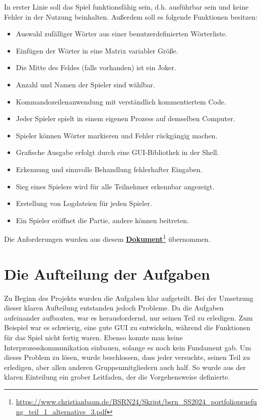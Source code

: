 \documentclass{llncs}
\begin{document}
In erster Linie soll das Spiel funktionsfähig sein, d.h. ausführbar sein und keine Fehler in der Nutzung beinhalten. Außerdem soll es folgende Funktionen besitzen: 
\begin{itemize} 
    \item Auswahl zufälliger Wörter aus einer benutzerdefinierten Wörterliste.
    \item Einfügen der Wörter in eine Matrix variabler Größe.
    \item Die Mitte des Feldes (falls vorhanden) ist ein Joker.
    \item Anzahl und Namen der Spieler sind wählbar.
    \item Kommandozeilenanwendung mit verständlich kommentiertem Code.
    \item Jeder Spieler spielt in einem eigenen Prozess auf demselben Computer.
    \item Spieler können Wörter markieren und Fehler rückgängig machen.
    \item Grafische Ausgabe erfolgt durch eine GUI-Bibliothek in der Shell.
    \item Erkennung und sinnvolle Behandlung fehlerhafter Eingaben.
    \item Sieg eines Spielers wird für alle Teilnehmer erkennbar angezeigt.
    \item Erstellung von Logdateien für jeden Spieler.
    \item Ein Spieler eröffnet die Partie, andere können beitreten.

\end{itemize}

Die Anforderungen wurden aus diesem \href{https://www.christianbaun.de/BSRN24/Skript/bsrn_SS2024_portfoliopruefung_teil_1_alternative_3.pdf}{\textbf{Dokument}}\footnote{\url{https://www.christianbaun.de/BSRN24/Skript/bsrn_SS2024_portfoliopruefung_teil_1_alternative_3.pdf}} übernommen.
 


\section{Die Aufteilung der Aufgaben}


Zu Beginn des Projekts wurden die Aufgaben klar aufgeteilt. Bei der Umsetzung dieser klaren Aufteilung entstanden jedoch Probleme. Da die Aufgaben aufeinander aufbauten, war es herausfordernd, nur seinen Teil zu erledigen. Zum Beispiel war es schwierig, eine gute GUI zu entwickeln, während die Funktionen für das Spiel nicht fertig waren. Ebenso konnte man keine Interprozesskommunikation einbauen, solange es noch kein Fundament gab. Um dieses Problem zu lösen, wurde beschlossen, dass jeder versuchte, seinen Teil zu erledigen, aber allen anderen Gruppenmitgliedern auch half. So wurde aus der klaren Einteilung ein grober Leitfaden, der die Vorgehensweise definierte.  
\end{document}
